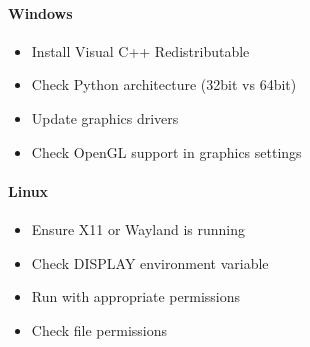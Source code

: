 \documentclass[a4paper,10pt,english,openany,oneside]{sphinxmanual}
\begin{document}
\paragraph{Windows}
\label{\detokenize{examples:windows}}\begin{description}
\begin{itemize}
\item {} 
\sphinxAtStartPar
Install Visual C++ Redistributable

\item {} 
\sphinxAtStartPar
Check Python architecture (32\sphinxhyphen{}bit vs 64\sphinxhyphen{}bit)

\end{itemize}

\begin{itemize}
\item {} 
\sphinxAtStartPar
Update graphics drivers

\item {} 
\sphinxAtStartPar
Check OpenGL support in graphics settings

\end{itemize}

\end{description}


\paragraph{Linux}
\label{\detokenize{examples:linux}}\begin{description}
\begin{itemize}
\item {} 
\sphinxAtStartPar
Ensure X11 or Wayland is running

\item {} 
\sphinxAtStartPar
Check DISPLAY environment variable

\end{itemize}

\begin{itemize}
\item {} 
\sphinxAtStartPar
Run with appropriate permissions

\item {} 
\sphinxAtStartPar
Check file permissions

\end{itemize}

\end{description}
\end{document}
